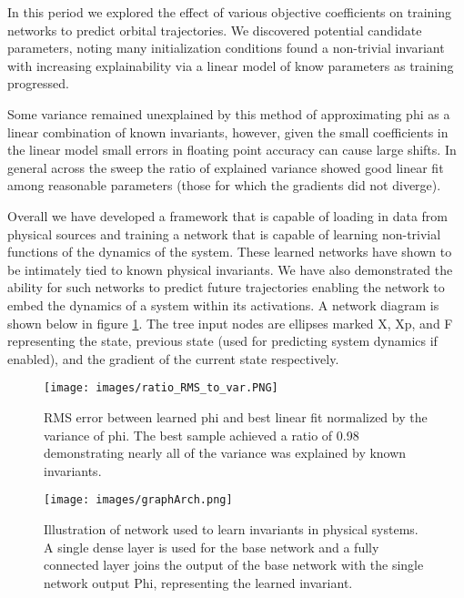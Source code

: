 \documentclass[10pt,letterpaper]{report}
\author{Brandon Houghton}
\begin{document}
	
	
	In this period we explored the effect of various objective coefficients on training networks to predict orbital trajectories. We discovered potential candidate parameters, noting many initialization conditions found a non-trivial invariant with increasing explainability via a linear model of know parameters as training progressed. 
	
	Some variance remained unexplained by this method of approximating phi as a linear combination of known invariants, however, given the small coefficients in the linear model small errors in floating point accuracy can cause large shifts. In general across the sweep the ratio of explained variance showed good linear fit among reasonable parameters (those for which the gradients did not diverge). 
	
	Overall we have developed a framework that is capable of loading in data from physical sources and training a network that is capable of learning non-trivial functions of the dynamics of the system. These learned networks have shown to be intimately tied to known physical invariants. We have also demonstrated the ability for such networks to predict future trajectories enabling the network to embed the dynamics of a system within its activations. A network diagram is shown below in figure \ref{graph}. The tree input nodes are ellipses marked X, Xp, and F representing the state, previous state (used for predicting system dynamics if enabled), and the gradient of the current state respectively.
	
	
	
	\begin{figure}
		\begin{center}
			\texttt{[image: images/ratio\_RMS\_to\_var.PNG]}
			\caption{\small RMS error between learned phi and best linear fit normalized by the variance of phi. The best sample achieved a ratio of  0.98 demonstrating nearly all of the variance was explained by known invariants. }
		\end{center}	
	\end{figure}
	
	
	
	
	\begin{figure}
		\begin{center}
			\texttt{[image: images/graphArch.png]}
			\caption{\small Illustration of network used to learn invariants in physical systems. A single dense layer is used for the base network and a fully connected layer joins the output of the base network with the single network output Phi, representing the learned invariant.}
			\label{graph}
		\end{center}	
	\end{figure}
	
	
\end{document}
